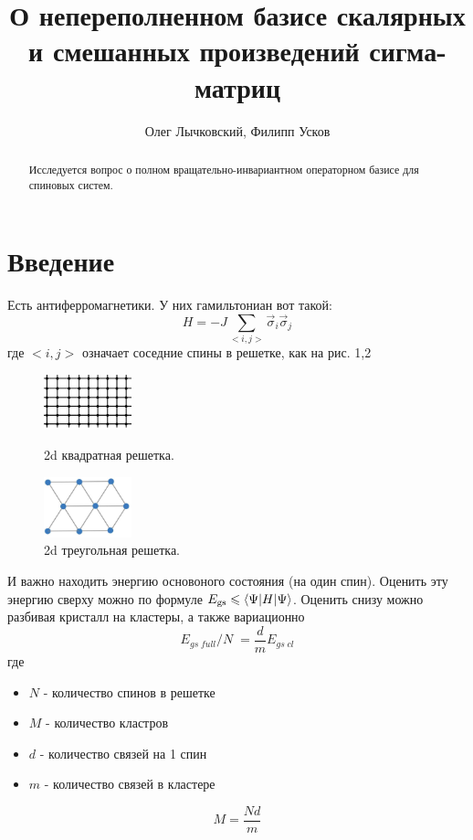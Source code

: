 \documentclass[]{article}
\title{О непереполненном базисе скалярных и смешанных произведений сигма-матриц}
\author{Олег Лычковский, Филипп Усков}
\begin{document}
\maketitle

\begin{abstract}
Исследуется вопрос о полном вращательно-инвариантном операторном базисе для спиновых систем.

\end{abstract}

\section{Введение}

Есть антиферромагнетики. У них гамильтониан вот такой:
$$H=-J\sum_{<i,j>}\vec\sigma_i\vec\sigma_j$$
где $<i,j>$ означает соседние спины в решетке, как на рис. 1,2
\begin{figure}[h]
	\begin{minipage}{6pc}
		\includegraphics[width=6pc]{sqlattice.png}
	\end{minipage}\hspace{2pc}%
	\begin{minipage}{5pc}
		\caption{\label{label} 2d квадратная решетка.}
	\end{minipage}\hspace{2pc}%
	\begin{minipage}{6pc}
		\includegraphics[width=6pc]{triangle-lattice.png}
	\end{minipage}\hspace{2pc}%
	\begin{minipage}{5pc}
		\caption{\label{label} 2d треугольная решетка.}
	\end{minipage} 
\end{figure}

И важно находить энергию основоного состояния (на один спин).
Оценить эту энергию сверху можно по формуле $E_{\rm gs} \leqslant \langle \Psi|H| \Psi \rangle$.
Оценить снизу можно разбивая кристалл на кластеры\cite{Anderson}, а также вариационно \cite{variational} 
$${E_{gs\;full}}/N\;=\frac{d}{m}{E_{gs\;cl}}$$
где
\begin{itemize}
	\item $N$ - количество спинов в решетке
	\item $M$ - количество кластров
	\item $d$ - количество связей на 1 спин
	\item $m$ - количество связей в кластере
\end{itemize}
$$M = \frac{{Nd}}{m} \label{MNdm} $$
\end{document}
